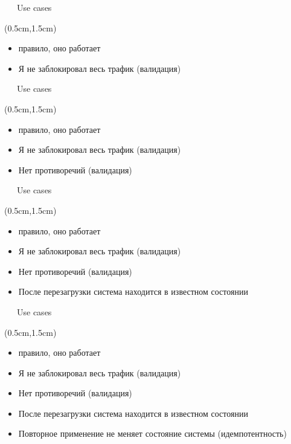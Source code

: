 \documentclass[xetex,18pt,aspectratio=43]{beamer}
\begin{document}
\begin{Large}
\begin{frame}{\ \ \ Use cases}
\begin{textblock*}{\framewidth-0.8cm}(0.5cm,1.5cm)
\begin{itemize}
  \item {\color {darkpastelgreen}{\bf Я добавляю}} правило, оно работает
  \item Я не заблокировал весь трафик (валидация)
\end{itemize}
\end{textblock*}
\end{frame}

\begin{frame}{\ \ \ Use cases}
\begin{textblock*}{\framewidth-0.8cm}(0.5cm,1.5cm)
\begin{itemize}
  \item {\color {darkpastelgreen}{\bf Я добавляю}} правило, оно работает
  \item Я не заблокировал весь трафик (валидация)
  \item Нет противоречий (валидация)
\end{itemize}
\end{textblock*}
\end{frame}

\begin{frame}{\ \ \ Use cases}
\begin{textblock*}{\framewidth-0.8cm}(0.5cm,1.5cm)
\begin{itemize}
  \item {\color {darkpastelgreen}{\bf Я добавляю}} правило, оно работает
  \item Я не заблокировал весь трафик (валидация)
  \item Нет противоречий (валидация)
  \item После перезагрузки система находится в известном состоянии
\end{itemize}
\end{textblock*}
\end{frame}

\begin{frame}{\ \ \ Use cases}
\begin{textblock*}{\framewidth-0.8cm}(0.5cm,1.5cm)
\begin{itemize}
  \item {\color {darkpastelgreen}{\bf Я добавляю}} правило, оно работает
  \item Я не заблокировал весь трафик (валидация)
  \item Нет противоречий (валидация)
  \item После перезагрузки система находится в известном состоянии
  \item Повторное применение не меняет состояние системы (идемпотентность)
\end{itemize}
\end{textblock*}
\end{frame}


\end{Large}
\end{document}
